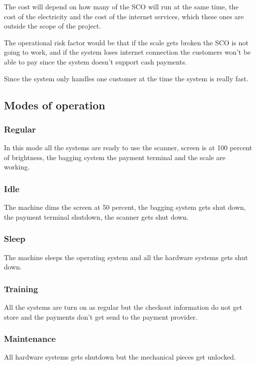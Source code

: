 \noindent
The cost will depend on how many of the SCO will run at the same time, the 
cost of the electricity and the cost of the internet services, which these 
ones are outside the scope of the project. 

\pagebreak

\noindent
The operational risk factor would be that if the scale gets broken the SCO is 
not going to work, and if the system loses internet connection the customers 
won't be able to pay since the system doesn't support cash payments. 
\newline

\noindent
Since the system only handles one customer at the time the system is 
really fast.

\subsection{Modes of operation}

\subsubsection{Regular}
In this mode all the systems are ready to use the scanner, screen is at 100 
percent of brightness, the bagging system the payment terminal 
and the scale are working.

\subsubsection{Idle}
The machine dims the screen at 50 percent, the bagging system gets shut 
down, the payment terminal shutdown, the scanner gets shut down.

\subsubsection{Sleep}
The machine sleeps the operating system and all the hardware systems 
gets shut down.

\subsubsection{Training}
All the systems are turn on as regular but the checkout information do 
not get store and the payments don't get send to the payment provider.

\subsubsection{Maintenance}
All hardware systems gets shutdown but the mechanical pieces get unlocked.

